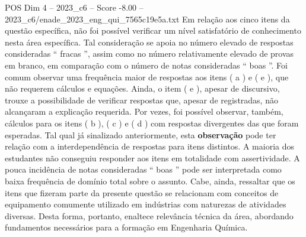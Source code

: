 \begin{textsample}{POS Dim 4 – 2023\_c6 – Score -8.00 – 2023\_c6/enade\_2023\_eng\_qui\_7565c19e5a.txt}
Em relação aos cinco itens da questão específica, não foi possível verificar um nível satisfatório de conhecimento nesta área específica.
Tal consideração se apoia no número elevado de respostas consideradas “ fracas ”, assim como no número relativamente elevado de provas em branco, em comparação com o número de notas consideradas “ boas ”.
Foi comum observar uma frequência maior de respostas aos itens ( a ) e ( e ), que não requerem cálculos e equações.
Ainda, o item ( e ), apesar de discursivo, trouxe a possibilidade de verificar respostas que, apesar de registradas, não alcançaram a explicação requerida.
Por vezes, foi possível observar, também, cálculos para os itens ( b ), ( c ) e ( d ) com respostas divergentes das que foram esperadas.
Tal qual já sinalizado anteriormente, esta \textbf{observação} pode ter relação com a interdependência de respostas para itens distintos.
A maioria dos estudantes não conseguiu responder aos itens em totalidade com assertividade.
A pouca incidência de notas consideradas “ boas ” pode ser interpretada como baixa frequência de domínio total sobre o assunto.
Cabe, ainda, ressaltar que os itens que fizeram parte da presente questão se relacionam com conceitos de equipamento comumente utilizado em indústrias com naturezas de atividades diversas.
Desta forma, portanto, enaltece relevância técnica da área, abordando fundamentos necessários para a formação em Engenharia Química.

\end{textsample}
